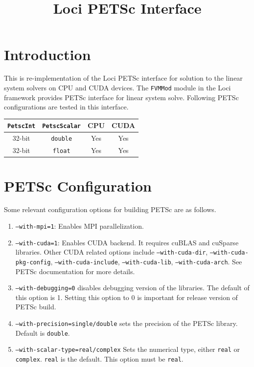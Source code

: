 \documentclass{article}
\title{Loci PETSc Interface}
\date{\nonumber}
\begin{document}
\maketitle

\section{Introduction}

This is re-implementation of the Loci PETSc interface for solution to
the linear system solvers on CPU and CUDA devices. The \texttt{FVMMod}
module in the Loci framework provides PETSc interface for linear
system solve. Following PETSc configurations are tested in this
interface.

\begin{table}[htbp]
\centering
\begin{tabular}{c|c|c|c}
\texttt{PetscInt} & \texttt{PetscScalar} & CPU & CUDA \\
\hline
32-bit & \texttt{double} & Yes & Yes \\
32-bit & \texttt{float} & Yes & Yes \\
\end{tabular}
\end{table}

\section{PETSc Configuration}
Some relevant configuration options for building PETSc are as follows.

\begin{enumerate}
\item \texttt{--with-mpi=1}: Enables MPI parallelization.
\item \texttt{--with-cuda=1}: Enables CUDA backend. It requires cuBLAS
  and cuSparse libraries. Other CUDA related options include
  \texttt{--with-cuda-dir}, \texttt{--with-cuda-pkg-config},
  \texttt{--with-cuda-include}, \texttt{--with-cuda-lib},
  \texttt{--with-cuda-arch}. See PETSc documentation for more details.
\item \texttt{--with-debugging=0} disables debugging version of the
  libraries. The default of this option is 1. Setting this option to 0
  is important for release version of PETSc build.
\item \texttt{--with-precision=single/double} sets the precision of
  the PETSc library. Default is \texttt{double}.
\item \texttt{--with-scalar-type=real/complex} Sets the numerical
  type, either \texttt{real} or \texttt{complex}. \texttt{real} is the
  default. This option must be \texttt{real}.
\end{enumerate}
\end{document}
